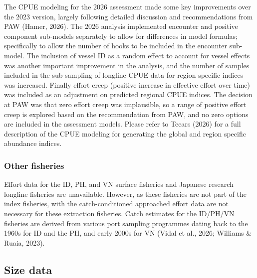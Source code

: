 \documentclass[
  english,
  a4paper,
  a4paper,
  11pt]{SCreport}
\begin{document}
The CPUE modeling for the 2026 assessment made some key improvements
over the 2023 version, largely following detailed discussion and
recommendations from PAW (Hamer, 2026). The 2026 analysis implemented
encounter and positive component sub-models separately to allow for
differences in model formulas; specifically to allow the number of hooks
to be included in the encounter sub-model. The inclusion of vessel ID as
a random effect to account for vessel effects was another important
improvement in the analysis, and the number of samples included in the
sub-sampling of longline CPUE data for region specific indices was
increased. Finally effort creep (positive increase in effective effort
over time) was included as an adjustment on predicted regional CPUE
indices. The decision at PAW was that zero effort creep was implausible,
so a range of positive effort creep is explored based on the
recommendation from PAW, and no zero options are included in the
assessment models. Please refer to Teears (2026) for a full description
of the CPUE modeling for generating the global and region specific
abundance indices.

\subsubsection{Other fisheries}\label{sec-catch-effort-other}

Effort data for the ID, PH, and VN surface fisheries and Japanese
research longline fisheries are unavailable. However, as these fisheries
are not part of the index fisheries, with the catch-conditioned
approached effort data are not necessary for these extraction fisheries.
Catch estimates for the ID/PH/VN fisheries are derived from various port
sampling programmes dating back to the 1960s for ID and the PH, and
early 2000s for VN (Vidal et al., 2026; Williams \& Ruaia, 2023).

\subsection{Size data}\label{sec-size-data}
\end{document}
